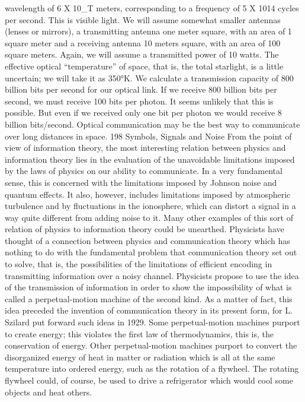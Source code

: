 {{{{{{{{{{{wavelength of 6 X 10_T meters, corresponding to a frequency of
5 X 1014 cycles per second. This is visible light. We will assume
somewhat smaller antennas (lenses or mirrors), a transmitting
antenna one meter square, with an area of 1 square meter and a
receiving antenna 10 meters square, with an area of 100 square
meters. Again, we will assume a transmitted power of 10 watts.
The effective optical “temperature” of space, that is, the total
starlight, is a little uncertain; we will take it as 350°K. We calculate
a transmission capacity of 800 billion bits per second for our
optical link.
If we receive 800 billion bits per second, we must receive 100
bits per photon. It seems unlikely that this is possible. But even if
we received only one bit per photon we would receive 8 billion
bits/second. Optical communication may be the best way to communicate
over long distances in space.
198
Symbols, Signals and Noise
From the point of view of information theory, the most interesting
relation between physics and information theory lies in the
evaluation of the unavoidable limitations imposed by the laws of
physics on our ability to communicate. In a very fundamental
sense, this is concerned with the limitations imposed by Johnson
noise and quantum effects. It also, however, includes limitations
imposed by atmospheric turbulence and by fluctuations in the
ionosphere, which can distort a signal in a way quite different from
adding noise to it. Many other examples of this sort of relation of
physics to information theory could be unearthed.
Physicists have thought of a connection between physics and
communication theory which has nothing to do with the fundamental
problem that communication theory set out to solve, that
is, the possibilities of the limitations of efficient encoding in transmitting
information over a noisy channel. Physicists propose to use
the idea of the transmission of information in order to show the
impossibility of what is called a perpetual-motion machine of the
second kind. As a matter of fact, this idea preceded the invention
of communication theory in its present form, for L. Szilard put
forward such ideas in 1929.
Some perpetual-motion machines purport to create energy; this
violates the first law of thermodynamics, this is, the conservation
of energy.
Other perpetual-motion machines purport to convert the disorganized
energy of heat in matter or radiation which is all at the
same temperature into ordered energy, such as the rotation of a
flywheel. The rotating flywheel could, of course, be used to drive
a refrigerator which would cool some objects and heat others.
}}}}}}}}}}}
